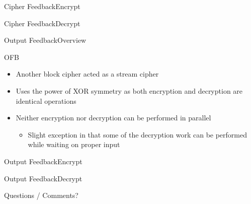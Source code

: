 \documentclass[12pt]{beamer}
\begin{document}
\begin{frame}{Cipher Feedback}{Encrypt}
\begin{center}
\end{center}
\end{frame}

\begin{frame}{Cipher Feedback}{Decrypt}
\begin{center}
\end{center}
\end{frame}

\begin{frame}{Output Feedback}{Overview}
\begin{block}{OFB}
\begin{itemize}
	\item Another block cipher acted as a stream cipher
	\item Uses the power of XOR symmetry as both encryption and decryption are identical operations
	\item Neither encryption nor decryption can be performed in parallel
	\begin{itemize}
		\item Slight exception in that some of the decryption work can be performed while waiting on proper input
	\end{itemize}
\end{itemize}
\end{block}
\end{frame}

\begin{frame}{Output Feedback}{Encrypt}
\begin{center}
\end{center}
\end{frame}

\begin{frame}{Output Feedback}{Decrypt}
\begin{center}
\end{center}
\end{frame}


\begin{frame}{Questions / Comments?}{}
\end{frame}
\end{document}
